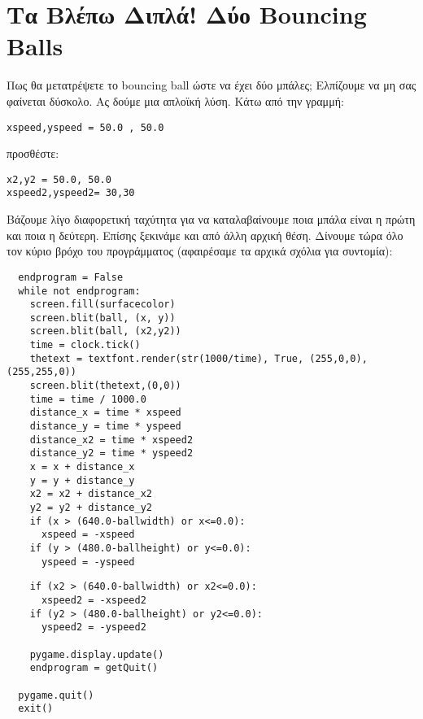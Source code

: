 \section{Τα Βλέπω Διπλά! Δύο Bouncing Balls}

Πως θα μετατρέψετε το bouncing ball ώστε να έχει δύο μπάλες; Ελπίζουμε να μη σας φαίνεται δύσκολο. Ας δούμε μια απλοϊκή λύση. Κάτω από την γραμμή:

\begin{verbatim}
xspeed,yspeed = 50.0 , 50.0
\end{verbatim}

προσθέστε:

\begin{verbatim}
x2,y2 = 50.0, 50.0
xspeed2,yspeed2= 30,30
\end{verbatim}

Βάζουμε λίγο διαφορετική ταχύτητα για να καταλαβαίνουμε ποια μπάλα είναι η
πρώτη και ποια η δεύτερη. Επίσης ξεκινάμε και από άλλη αρχική θέση. Δίνουμε τώρα όλο τον κύριο βρόχο του προγράμματος (αφαιρέσαμε τα αρχικά σχόλια για συντομία):

\begin{verbatim}
  endprogram = False
  while not endprogram:
    screen.fill(surfacecolor)
    screen.blit(ball, (x, y))
    screen.blit(ball, (x2,y2))
    time = clock.tick()
    thetext = textfont.render(str(1000/time), True, (255,0,0),(255,255,0))
    screen.blit(thetext,(0,0))
    time = time / 1000.0
    distance_x = time * xspeed
    distance_y = time * yspeed
    distance_x2 = time * xspeed2
    distance_y2 = time * yspeed2
    x = x + distance_x
    y = y + distance_y
    x2 = x2 + distance_x2
    y2 = y2 + distance_y2
    if (x > (640.0-ballwidth) or x<=0.0):
      xspeed = -xspeed
    if (y > (480.0-ballheight) or y<=0.0):
      yspeed = -yspeed
\end{verbatim}

\begin{verbatim}
    if (x2 > (640.0-ballwidth) or x2<=0.0):
      xspeed2 = -xspeed2
    if (y2 > (480.0-ballheight) or y2<=0.0):
      yspeed2 = -yspeed2

    pygame.display.update()
    endprogram = getQuit()

  pygame.quit()
  exit()
\end{verbatim}

